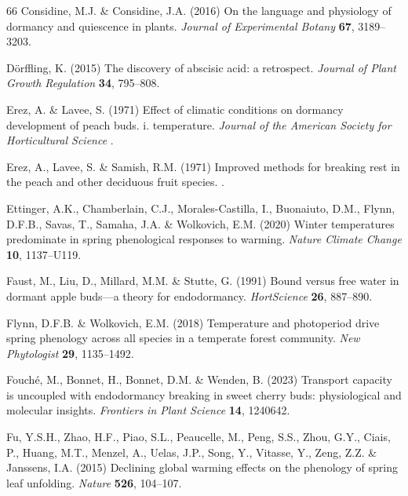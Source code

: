 \documentclass[11pt]{article}
\begin{document}
\begin{thebibliography}{66}
Considine, M.J. \& Considine, J.A. (2016) On the language and physiology of
  dormancy and quiescence in plants. \emph{Journal of Experimental Botany}
  \textbf{67}, 3189--3203.

D{\"o}rffling, K. (2015) The discovery of abscisic acid: a retrospect.
  \emph{Journal of Plant Growth Regulation} \textbf{34}, 795--808.

Erez, A. \& Lavee, S. (1971) Effect of climatic conditions on dormancy
  development of peach buds. i. temperature. \emph{Journal of the American
  Society for Horticultural Science} .

Erez, A., Lavee, S. \& Samish, R.M. (1971) Improved methods for breaking rest
  in the peach and other deciduous fruit species. .

Ettinger, A.K., Chamberlain, C.J., Morales-Castilla, I., Buonaiuto, D.M.,
  Flynn, D.F.B., Savas, T., Samaha, J.A. \& Wolkovich, E.M. (2020) Winter
  temperatures predominate in spring phenological responses to warming.
  \emph{Nature Climate Change} \textbf{10}, 1137--U119.

Faust, M., Liu, D., Millard, M.M. \& Stutte, G. (1991) Bound versus free water
  in dormant apple buds---a theory for endodormancy. \emph{HortScience}
  \textbf{26}, 887--890.

Flynn, D.F.B. \& Wolkovich, E.M. (2018) Temperature and photoperiod drive
  spring phenology across all species in a temperate forest community.
  \emph{New Phytologist} \textbf{29}, 1135--1492.

Fouch{\'e}, M., Bonnet, H., Bonnet, D.M. \& Wenden, B. (2023) Transport
  capacity is uncoupled with endodormancy breaking in sweet cherry buds:
  physiological and molecular insights. \emph{Frontiers in Plant Science}
  \textbf{14}, 1240642.

Fu, Y.S.H., Zhao, H.F., Piao, S.L., Peaucelle, M., Peng, S.S., Zhou, G.Y.,
  Ciais, P., Huang, M.T., Menzel, A., Uelas, J.P., Song, Y., Vitasse, Y., Zeng,
  Z.Z. \& Janssens, I.A. (2015) Declining global warming effects on the
  phenology of spring leaf unfolding. \emph{Nature} \textbf{526}, 104--107.


\end{thebibliography}
\end{document}

